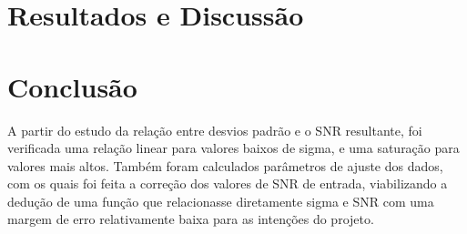 \documentclass{article}
\begin{document}
\section{Resultados e Discussão}

\section{Conclusão}

A partir do estudo da relação entre desvios padrão e o SNR resultante, 
foi verificada uma relação linear para valores baixos de sigma, e uma 
saturação para valores mais altos. Também foram calculados 
parâmetros de ajuste dos dados, com os quais foi feita a correção dos 
valores de SNR de entrada, viabilizando a dedução de uma função que 
relacionasse diretamente sigma e SNR com uma margem de erro 
relativamente baixa para as intenções do projeto.


\end{document}
